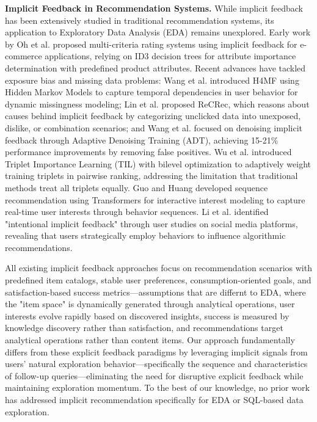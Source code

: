 \documentclass[sigconf, nonacm]{acmart}
\begin{document}
\textbf{Implicit Feedback in Recommendation Systems.} While implicit feedback has been extensively studied in traditional recommendation systems, its application to Exploratory Data Analysis (EDA) remains unexplored. Early work by Oh et al. \cite{oh2008user} proposed multi-criteria rating systems using implicit feedback for e-commerce applications, relying on ID3 decision trees for attribute importance determination with predefined product attributes. Recent advances have tackled exposure bias and missing data problems: Wang et al. \cite{wang2018modeling} introduced H4MF using Hidden Markov Models to capture temporal dependencies in user behavior for dynamic missingness modeling; Lin et al. \cite{lin2024recrec} proposed ReCRec, which reasons about causes behind implicit feedback by categorizing unclicked data into unexposed, dislike, or combination scenarios; and Wang et al. \cite{wang2021denoising} focused on denoising implicit feedback through Adaptive Denoising Training (ADT), achieving 15-21\% performance improvements by removing false positives. Wu et al. \cite{wu2022adapting} introduced Triplet Importance Learning (TIL) with bilevel optimization to adaptively weight training triplets in pairwise ranking, addressing the limitation that traditional methods treat all triplets equally. Guo and Huang \cite{guo2023implicit} developed sequence recommendation using Transformers for interactive interest modeling to capture real-time user interests through behavior sequences. Li et al. \cite{li2025beyond} identified "intentional implicit feedback" through user studies on social media platforms, revealing that users strategically employ behaviors to influence algorithmic recommendations.

All existing implicit feedback approaches focus on recommendation scenarios with predefined item catalogs, stable user preferences, consumption-oriented goals, and satisfaction-based success metrics—assumptions that are differnt to EDA, where the "item space" is dynamically generated through analytical operations, user interests evolve rapidly based on discovered insights, success is measured by knowledge discovery rather than satisfaction, and recommendations target analytical operations rather than content items. Our approach fundamentally differs from these explicit feedback paradigms by leveraging implicit signals from users' natural exploration behavior—specifically the sequence and characteristics of follow-up queries—eliminating the need for disruptive explicit feedback while maintaining exploration momentum. To the best of our knowledge, no prior work has addressed implicit recommendation specifically for EDA or SQL-based data exploration.
\end{document}
